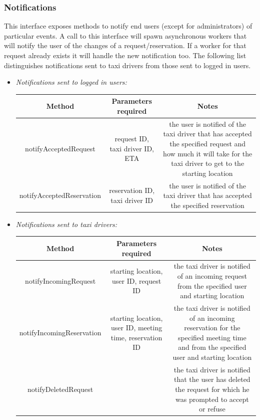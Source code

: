 \documentclass{article}
\begin{document}
\begin{itemize}
			\subsubsection{Notifications} %
			This interface exposes methods to notify end users (except for administrators) of particular events. 
			A call to this interface will spawn asynchronous workers that will notify the user of the changes of a request/reservation.
			If a worker for that request already exists it will handle the new notification too.
			The following list distinguishes notifications sent to taxi drivers from those sent to logged in users.
			\begin{itemize}
				\item \textit{Notifications sent to logged in users:} \\
					\begin{adjustbox}{width=1.2\textwidth}	
						\begin{tabular}{*{3}{c}}
							\toprule
							Method & Parameters required & Notes \\
							\midrule
							notifyAcceptedRequest & request ID, taxi driver ID, ETA & the user is notified of the taxi driver that has accepted the specified request and how much it will take for the taxi driver to get to the starting location\\ 
							notifyAcceptedReservation & reservation ID, taxi driver ID & the user is notified of the taxi driver that has accepted the specified reservation \\
				\bottomrule
			\end{tabular}
		\end{adjustbox}	
	\item \textit{Notifications sent to taxi drivers:} \\
		\begin{adjustbox}{width=1.2\textwidth}	
			\begin{tabular}{*{3}{c}}
				\toprule
				Method & Parameters required & Notes \\
				\midrule
				notifyIncomingRequest & starting location, user ID, request ID & the taxi driver is notified of an incoming request from the specified user and starting location\\ 
				notifyIncomingReservation & starting location, user ID, meeting time, reservation ID & the taxi driver is notified of an incoming reservation for the specified meeting time and from the specified user and starting location \\
				notifyDeletedRequest & & the taxi driver is notified that the user has deleted the request for which he was prompted to accept or refuse\\
				\bottomrule
			\end{tabular}
		\end{adjustbox}	
\end{itemize}		
\end{itemize}
\end{document}
